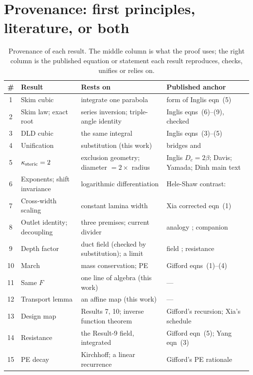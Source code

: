 \section{Provenance: first principles, literature, or both}
\label{sec:prov}

\begin{table}[ht]
\centering
\small
\begin{tabular}{@{}clp{3.7cm}p{5.0cm}@{}}
\toprule
\# & Result & Rests on & Published anchor \\
\midrule
1 & Skim cubic & integrate one parabola & form of Inglis eqn~(5) \cite{b17} \\
2 & Skim law; exact root & series inversion; triple-angle identity & Inglis eqns~(6)--(9), checked \cite{b17} \\
3 & DLD cubic & the same integral & Inglis eqns~(3)--(5) \cite{b17} \\
4 & Unification & substitution (this work) & bridges \cite{b17} and \cite{b1} \\
5 & $\kappa_{\mathrm{steric}}=2$ & exclusion geometry; diameter $=2\times$ radius & Inglis $D_c=2\beta$; Davis; Yamada; Dinh main text \cite{b17,bdavis06,b15,b5} \\
6 & Exponents; shift invariance & logarithmic differentiation & Hele-Shaw contrast: \cite{b13,bbrody} \\
7 & Cross-width scaling & constant lamina width & Xia corrected eqn~(1) \cite{b3} \\
8 & Outlet identity; decoupling & three premises; current divider & analogy \cite{b13}; companion \cite{bpre} \\
9 & Depth factor & duct field (checked by substitution); a limit & field \cite{bbrody}; resistance \cite{b6} \\
10 & March & mass conservation; PE & Gifford eqns~(1)--(4) \cite{b1} \\
11 & Same $F$ & one line of algebra (this work) & --- \\
12 & Transport lemma & an affine map (this work) & --- \\
13 & Design map & Results 7, 10; inverse function theorem & Gifford's recursion; Xia's schedule \cite{b1,b3} \\
14 & Resistance & the Result-9 field, integrated & Gifford eqn~(5); Yang eqn~(3) \cite{b1,b6} \\
15 & PE decay & Kirchhoff; a linear recurrence & Gifford's PE rationale \cite{b1} \\
\bottomrule
\end{tabular}
\caption{Provenance of each result. The middle column is what the proof uses; the right column is
the published equation or statement each result reproduces, checks, unifies or relies on.}
\label{tab:prov}
\end{table}

